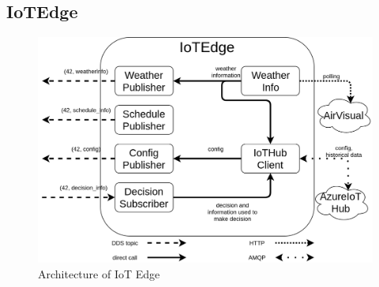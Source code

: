 \documentclass{article}
\begin{document}
\subsection{IoTEdge}
\begin{figure}[!htb]
  \includegraphics[width=\linewidth]{imgs/edge.png}
  \caption{Architecture of IoT Edge}
  \label{fig:arc_edge}
\end{figure}
\end{document}
